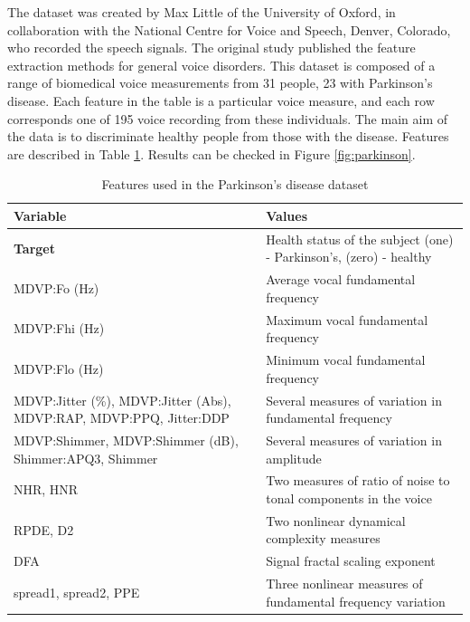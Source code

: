 \documentclass[10pt,a4paper,twoside]{book}
\begin{document}
The dataset was created by Max Little of the University of Oxford, in collaboration with the National Centre for Voice and Speech, Denver, Colorado, who recorded the speech signals. The original study \cite{Little2007} published the feature extraction methods for general voice disorders. This dataset is composed of a range of biomedical voice measurements from 31 people, 23 with Parkinson's disease. Each feature in the table is a particular voice measure, and each row corresponds one of 195 voice recording from these individuals. The main aim of the data is to discriminate healthy people from those with the disease. Features are described in Table \ref{parkinsons}. Results can be checked in Figure \ref{fig:parkinson}.


\begin{table}[]
\centering
\caption{Features used in the Parkinson's disease dataset}
\label{parkinsons}
\begin{tabular}{p{7cm}p{7cm}}
\toprule
\textbf{Variable}                                                   & \textbf{Values}                                                    \\ \midrule
\textbf{Target}                                                     & Health status of the subject (one) - Parkinson's, (zero) - healthy \\
MDVP:Fo (Hz)                                                        & Average vocal fundamental frequency                                \\
MDVP:Fhi (Hz)                                                       & Maximum vocal fundamental frequency                                \\
MDVP:Flo (Hz)                                                       & Minimum vocal fundamental frequency                                \\
MDVP:Jitter (\%), MDVP:Jitter (Abs), MDVP:RAP, MDVP:PPQ, Jitter:DDP & Several measures of variation in fundamental frequency             \\
MDVP:Shimmer, MDVP:Shimmer (dB), Shimmer:APQ3, Shimmer              & Several measures of variation in amplitude                         \\
NHR, HNR                                                            & Two measures of ratio of noise to tonal components in the voice    \\
RPDE, D2                                                            & Two nonlinear dynamical complexity measures                        \\
DFA                                                                 & Signal fractal scaling exponent                                    \\
spread1, spread2, PPE                                               & Three nonlinear measures of fundamental frequency variation        \\ \bottomrule
\end{tabular}
\end{table}
\end{document}

